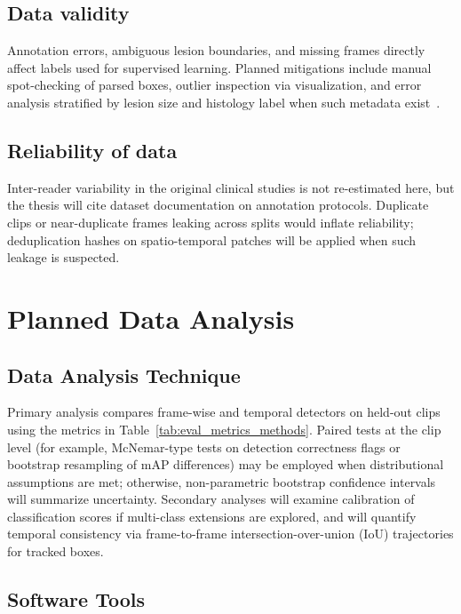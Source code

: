 \documentclass[
english,                 %
bibtex,                  %
]{kththesis}
\numberwithin{listing}{chapter}
\begin{document}
\subsection{Data validity}
\label{sec:dataValidity}

Annotation errors, ambiguous lesion boundaries, and missing frames directly affect labels used for supervised learning.
Planned mitigations include manual spot-checking of parsed boxes, outlier inspection via visualization, and error analysis stratified by lesion size and histology label when such metadata exist~\cite{lin2022_buv_miccai}.

\subsection{Reliability of data}
\label{sec:reliabilityOfData}

Inter-reader variability in the original clinical studies is not re-estimated here, but the thesis will cite dataset documentation on annotation protocols.
Duplicate clips or near-duplicate frames leaking across splits would inflate reliability; deduplication hashes on spatio-temporal patches will be applied when such leakage is suspected.


\section{Planned Data Analysis}
\label{sec:plannedDataAnalysis}

\subsection{Data Analysis Technique}
\label{sec:dataAnalysisTechnique}

Primary analysis compares frame-wise and temporal detectors on held-out clips using the metrics in Table~\ref{tab:eval_metrics_methods}.
Paired tests at the clip level (for example, McNemar-type tests on detection correctness flags or bootstrap resampling of mAP differences) may be employed when distributional assumptions are met; otherwise, non-parametric bootstrap confidence intervals will summarize uncertainty.
Secondary analyses will examine calibration of classification scores if multi-class extensions are explored, and will quantify temporal consistency via frame-to-frame intersection-over-union (IoU) trajectories for tracked boxes.

\subsection{Software Tools}
\label{sec:softwareTools}
\end{document}
